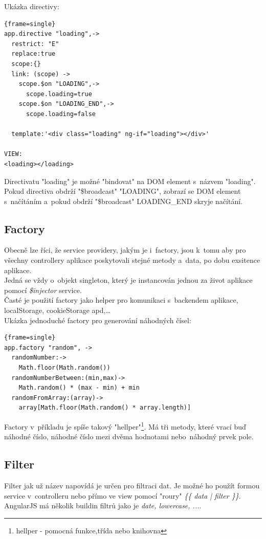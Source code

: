 \documentclass[a4paper,12pt,twoside,BCOR=10mm]{article}
\renewcommand{\it}[1]{\textit{#1}}    %
\newenvironment{codeframe}{%
  \begin{Sbox} 
    \begin{minipage} 
      {\columnwidth-\leftmargin-\rightmargin-2\fboxsep-2\fboxrule-4pt} 
}{%

  \end{minipage} 
  \end{Sbox} 
  \begin{center} 
    \fcolorbox{black}{codeback}{\TheSbox} 
  \end{center} 
}
\begin{document}
Ukázka directivy:
     \begin{codeframe} 
      \begin{Verbatim}{frame=single}
app.directive "loading",->
  restrict: "E"
  replace:true
  scope:{}
  link: (scope) ->
    scope.$on "LOADING",->
      scope.loading=true
    scope.$on "LOADING_END",->
      scope.loading=false

  template:'<div class="loading" ng-if="loading"></div>'

VIEW:
<loading></loading>
\end{Verbatim} 
    \end{codeframe}
Directivatu "loading" je možné "bindovat" na DOM element s~názvem "loading". Pokud directiva obdrží "\$broadcast" "LOADING", zobrazí se DOM element s~načítáním a~pokud obdrží "\$broadcast" LOADING\_END skryje načítání.\cite{ngBOOK}

\subsection{Factory}
Obecně lze říci, že service providery, jakým je i~factory, jsou k~tomu aby pro všechny controllery aplikace poskytovali stejné metody a~data, po dobu exsitence aplikace.\\

Jedná se vždy o~objekt singleton, který je instancován jednou za život aplikace pomocí \it{\$injector} service.\cite{ngBOOK}\\

Časté je použití factory jako helper pro komunikaci s~backendem aplikace, localStorage, cookieStorage apd,…\\

Ukázka jednoduché factory pro generování náhodných čísel:
     \begin{codeframe} 
      \begin{Verbatim}{frame=single}
app.factory "random", ->
  randomNumber:->
    Math.floor(Math.random())
  randomNumberBetween:(min,max)->
    Math.random() * (max - min) + min
  randomFromArray:(array)->
    array[Math.floor(Math.random() * array.length)]
\end{Verbatim} 
    \end{codeframe}
Factory v~příkladu je spíše takový "hellper"\footnote{hellper - pomocná funkce,třída nebo knihovna}. Má tři metody, které vrací buď náhodné číslo, náhodné číslo mezi dvěma hodnotami nebo~náhodný prvek pole.

\subsection{Filter}
Filter jak už název napovídá je určen pro filtraci dat. Je možné ho použít formou service v~controlleru nebo přímo ve view pomocí "roury" \it{\{\{ data | filter \}\}}. AngularJS má několik buildin filtrů jako je \it{date, lowercase, ...}.\cite{ngBOOK}
\end{document}
